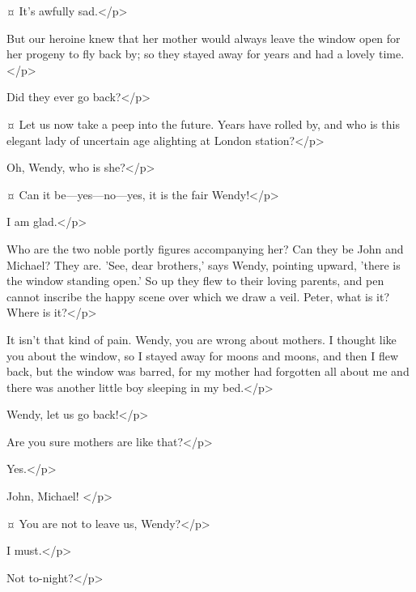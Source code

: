\begin{drama}
\firsttwinspeaks {}¤
It's awfully sad.</p>

\wendyspeaks
But our heroine knew that her mother would always leave the window open for her progeny to fly back by;
so they stayed away for years and had a lovely time.</p>


\firsttwinspeaks
Did they ever go back?</p>

\wendyspeaks {}¤
Let us now take a peep into the future.
Years have rolled by, and who is this elegant lady of uncertain age alighting at London station?</p>


\nibsspeaks
Oh, Wendy, who is she?</p>

\wendyspeaks {}¤
Can it be—yes—no—yes, it is the fair Wendy!</p>

\tootlesspeaks
I am glad.</p>

\wendyspeaks
Who are the two noble portly figures accompanying her?
Can they be John and Michael?
They are.
'See, dear brothers,' says Wendy, pointing upward, 'there is the window standing open.'
So up they flew to their loving parents, and pen cannot inscribe the happy scene over which we draw a veil.
Peter, what is it?
Where is it?</p>

\peterspeaks
It isn't that kind of pain.
Wendy, you are wrong about mothers.
I thought like you about the window, so I stayed away for moons and moons,
and then I flew back, but the window was barred,
for my mother had forgotten all about me and there was another little boy sleeping in my bed.</p>


\johnspeaks
Wendy, let us go back!</p>

\wendyspeaks
Are you sure mothers are like that?</p>

\peterspeaks
Yes.</p>

\wendyspeaks
John, Michael!
</p>

\firsttwinspeaks {}¤
You are not to leave us, Wendy?</p>

\wendyspeaks
I must.</p>

\nibsspeaks
Not to-night?</p>


\end{drama}

